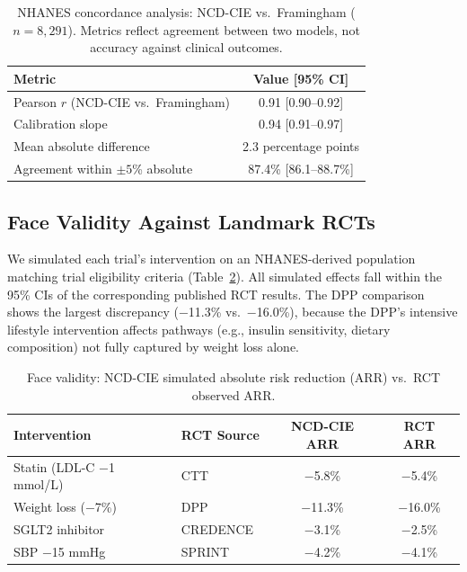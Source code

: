 \documentclass[runningheads]{llncs}
\begin{document}
\begin{table}[t]
\centering
\caption{NHANES concordance analysis: NCD-CIE vs.\ Framingham
($n = 8{,}291$).  Metrics reflect agreement between two models,
not accuracy against clinical outcomes.}
\label{tab:nhanes}
\small
\begin{tabular}{@{}lc@{}}
\toprule
\textbf{Metric} & \textbf{Value [95\% CI]} \\
\midrule
Pearson $r$ (NCD-CIE vs.\ Framingham) & 0.91 [0.90--0.92] \\
Calibration slope                       & 0.94 [0.91--0.97] \\
Mean absolute difference                & 2.3 percentage points \\
Agreement within $\pm 5$\% absolute     & 87.4\% [86.1--88.7\%] \\
\bottomrule
\end{tabular}
\end{table}

\subsection{Face Validity Against Landmark RCTs}\label{sec:faceval}

We simulated each trial's intervention on an NHANES-derived population
matching trial eligibility criteria (Table~\ref{tab:rct}).  All
simulated effects fall within the 95\% CIs of the corresponding
published RCT results.  The DPP comparison shows the largest
discrepancy ($-$11.3\% vs.\ $-$16.0\%), because the DPP's intensive
lifestyle intervention affects pathways (e.g., insulin sensitivity,
dietary composition) not fully captured by weight loss alone.

\begin{table}[t]
\centering
\caption{Face validity: NCD-CIE simulated absolute risk reduction
(ARR) vs.\ RCT observed ARR.}
\label{tab:rct}
\small
\begin{tabular}{@{}llcc@{}}
\toprule
\textbf{Intervention} & \textbf{RCT Source} &
\textbf{NCD-CIE ARR} & \textbf{RCT ARR} \\
\midrule
Statin (LDL-C $-$1 mmol/L) & CTT~\cite{ctt2010}
  & $-$5.8\% & $-$5.4\% \\
Weight loss ($-$7\%) & DPP~\cite{knowler2002dpp}
  & $-$11.3\% & $-$16.0\% \\
SGLT2 inhibitor & CREDENCE~\cite{perkovic2019credence}
  & $-$3.1\% & $-$2.5\% \\
SBP $-$15 mmHg & SPRINT~\cite{sprint2015}
  & $-$4.2\% & $-$4.1\% \\
\bottomrule
\end{tabular}
\end{table}
\end{document}
